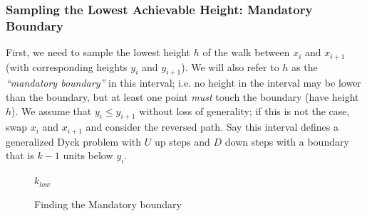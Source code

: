 \subsubsection{Sampling the Lowest Achievable Height: Mandatory Boundary}
\label{sec:sampling_the_lowest_achievable_height}
First, we need to sample the lowest height $h$ of the walk between $x_i$ and $x_{i+1}$ (with corresponding heights $y_i$ and $y_{i+1}$).
We will also refer to $h$ as the \emph{``mandatory boundary''} in this interval;
i.e. no height in the interval may be lower than the boundary, but at least one point \emph{must} touch the boundary (have height $h$).
We assume that $y_i\le y_{i+1}$ without loss of generality; if this is not the case, swap $x_i$ and $x_{i+1}$ and consider the reversed path.
Say this interval defines a generalized Dyck problem with $U$ up steps and $D$ down steps with a boundary that is $k-1$ units below $y_i$.
\begin{figure}
\vspace{-3.0em}
\begin{framed}
    \renewcommand\figurename{Algorithm}
    \caption{Finding the Mandatory boundary}
    \label{alg:mandatory_boundary}
    \begin{algorithmic}[1]
                \vspace{.3em}
                \vspace{.3em}
                \vspace{.3em}
                \vspace{.3em}
            \EndWhile
            \State \Return $k_{low}$
        \EndFunction
    \end{algorithmic}
\end{framed}
\end{figure}

